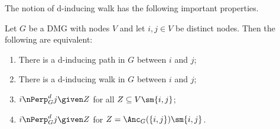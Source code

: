The notion of d-inducing walk has the following important properties.
\begin{Prp}\label{prp:d-inducing_path_properties}
  Let $G$ be a DMG with nodes $V$ and let $i,j \in V$ be distinct nodes. 
  Then the following are equivalent:
  \begin{enumerate}[label=(\roman*)]
    \item There is a d-inducing path in $G$ between $i$ and $j$;\label{prp:d-inducing_path_properties2:i}
    \item There is a d-inducing walk in $G$ between $i$ and $j$;\label{prp:d-inducing_path_properties2:ii}
    \item $i \nPerp^d_G j \given Z$ for all $Z \subseteq V \sm \{i,j\}$;\label{prp:d-inducing_path_properties2:iii}
    \item $i \nPerp^d_G j \given Z$ for $Z = \Anc_G(\{i,j\}) \sm \{i,j\}$.\label{prp:d-inducing_path_properties2:iv}
  \end{enumerate}
\end{Prp}
